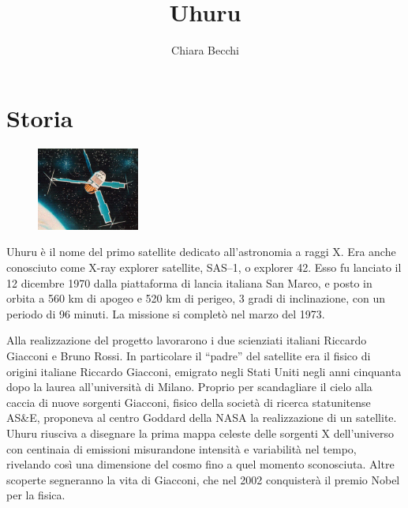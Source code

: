 \documentclass[12pt,a4paper]{article}
\begin{document}
\title{\vspace{-70pt}Uhuru}
\author{Chiara Becchi}
\date{}
\maketitle
\pagestyle{empty}
\thispagestyle{empty}

\section*{Storia}
\label{storia}
\begin{figure}
  \vspace{-10pt}
  \begin{center}
    \includegraphics[width=0.30\textwidth]{satellite}
  \end{center}
  \vspace{-20pt}
\end{figure}
Uhuru è il nome del primo satellite dedicato all'astronomia a raggi X. Era anche conosciuto come X-ray explorer satellite, SAS--1, o explorer 42.
Esso fu lanciato il 12 dicembre 1970 dalla piattaforma di lancia italiana San Marco, e posto in orbita a 560 km di apogeo e 520 km di perigeo, 3 gradi di inclinazione, con un periodo di 96 minuti. La missione si completò nel marzo del 1973.

Alla realizzazione del progetto lavorarono i due scienziati italiani Riccardo Giacconi e Bruno Rossi. In particolare il ``padre'' del satellite era il fisico di origini italiane Riccardo Giacconi, emigrato negli Stati Uniti negli anni cinquanta dopo la laurea all'università di Milano. Proprio per scandagliare il cielo alla caccia di nuove sorgenti Giacconi, fisico della società di ricerca statunitense AS\&E, proponeva al centro Goddard della NASA la realizzazione di un satellite. Uhuru riusciva a disegnare la prima mappa celeste delle sorgenti X dell'universo con centinaia di emissioni misurandone intensità e variabilità nel tempo, rivelando così una dimensione del cosmo fino a quel momento sconosciuta. Altre scoperte segneranno la vita di Giacconi, che nel 2002 conquisterà il premio Nobel per la fisica. 
\end{document}
